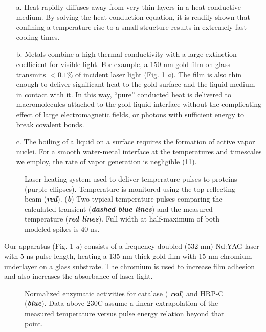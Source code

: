 \documentclass{biophys}
\begin{document}
\begin{itemize}
\item[a.] Heat rapidly diffuses away from very thin layers in a heat conductive medium. By solving the heat conduction equation, it is readily shown that confining a temperature rise to a small structure results in extremely fast cooling times.

\item[b.] Metals combine a high thermal conductivity with a large extinction coefficient for visible light. For example, a 150 nm gold film on glass transmits $<0.1\%$ of incident laser light (Fig. 1 {\it a}). The film is also thin enough to deliver significant heat to the gold surface and the liquid medium in contact with it. In this way, ``pure'' conducted heat is delivered to macromolecules attached to the gold-liquid interface without the complicating effect of large electromagnetic fields, or photons with sufficient energy to break covalent bonds.

\item[c.] The boiling of a liquid on a surface requires the formation of active vapor nuclei. For a smooth water-metal interface at the temperatures and timescales we employ, the rate of vapor generation is negligible (11).
\end{itemize}


\begin{figure}[t!]
\caption{Laser heating system used to deliver temperature pulses to proteins (purple ellipses). Temperature is monitored using the top reflecting beam ({\bfseries\itshape red}). ({\bfseries\itshape b}) Two typical temperature pulses comparing the calculated transient ({\bfseries\itshape dashed blue lines}) and the measured temperature ({\bfseries\itshape red lines}). Full width at half-maximum  of both modeled spikes is 40 ns.}
\end{figure}


Our apparatus (Fig. 1 {\it a}) consists of a frequency doubled (532 nm) Nd:YAG laser with 5 ns pulse length, heating a 135 nm thick gold film with 15 nm chromium underlayer on a glass substrate. The chromium is used to increase film adhesion and also increases the absorbance of laser light.

\begin{figure}[b!]
\caption{Normalized enzymatic activities for catalase ({\bfseries\itshape
red}) and HRP-C ({\bfseries\itshape blue}). Data above $\mbox{230}$\textdegree C assume a linear extrapolation of the measured temperature versus pulse energy relation beyond that point.}
\end{figure}
\end{document}
